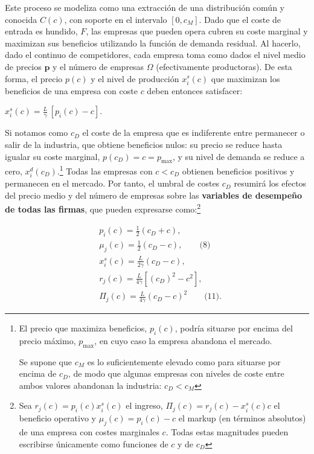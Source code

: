\documentclass[10pt,a4paper]{article}
\begin{document}
Este proceso se modeliza como una extracción de una distribución común y conocida $C(c)$, con soporte en el intervalo $[0, c_M]$. Dado que el coste de entrada es hundido, $F$, las empresas que pueden opera cubren su coste marginal y maximizan sus beneficios utilizando la función de demanda residual. Al hacerlo, dado el continuo de competidores, cada empresa toma como dados el nivel medio de precios $\mathbf{p}$ y el número de empresas $\Omega$ (efectivamente productoras). De esta forma, el precio $p(c)$ y el nivel de producción $x_i^s(c)$ que maximizan los beneficios de una empresa con coste $c$ deben entonces satisfacer:

$x_i^s(c) = \frac{L}{\gamma}\,[p_i(c) - c]$.

Si notamos como $c_D$ el coste de la empresa que es indiferente entre permanecer o salir de la industria, que obtiene beneficios nulos: su precio se reduce hasta igualar su coste marginal, $p(c_D) = c = p_{\max}$, y su nivel de demanda se reduce a cero, $x_i^d(c_D)$.\footnote{
El precio que maximiza beneficios, $p_i(c)$, podría situarse por encima del precio máximo, $p_{\max}$, en cuyo caso la empresa abandona el mercado.

Se supone que $c_M$ es lo suficientemente elevado como para situarse por encima de $c_D$, de modo que algunas empresas con niveles de coste entre ambos valores abandonan la industria: $c_D<c_M$
} Todas las empresas con $c < c_D$ obtienen beneficios positivos y permanecen en el mercado. Por tanto, el umbral de costes $c_D$ resumirá los efectos del precio medio y del número de empresas sobre las \textbf{variables de desempeño de todas las firmas}, que pueden expresarse como:\footnote{
Sea $r_j(c) = p_i(c) x_i^s(c)$ el ingreso, $\Pi_j(c) = r_j(c) - x_i^s(c)c$ el beneficio operativo y $\mu_j(c) = p_i(c) - c$ el markup (en términos absolutos) de una empresa con costes marginales $c$. Todas estas magnitudes pueden escribirse únicamente como funciones de $c$ y de $c_D$
}

$$\begin{aligned}
    &p_i(c) = \frac{1}{2}(c_D + c),\\[1em]
    &\mu_j(c) = \frac{1}{2}(c_D - c),\qquad \text{(8)}\\[1em]
    &x_i^s(c) = \frac{L}{2\gamma}(c_D - c),\\[1em]
    &r_j(c) = \frac{L}{4\gamma}\left[\left(c_D\right)^2 - c^2\right],\\[1em]
    &\Pi_j(c) = \frac{L}{4\gamma}\left(c_D - c\right)^2\qquad \text{(11)}.
\end{aligned}$$
\end{document}
